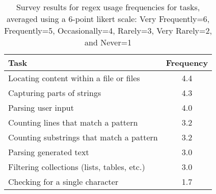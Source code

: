 \begin{table}
\caption{Survey results for regex usage frequencies for tasks, averaged using a 6-point likert scale: Very Frequently=6, Frequently=5, Occasionally=4, Rarely=3, Very Rarely=2, and Never=1 \label{table:regextasks}}
\begin{center}
\begin{small}
\begin{tabular}{l|c}
\toprule
\textbf{Task} & \textbf{Frequency} \\  \midrule \bigstrut
Locating content within a file or files & 4.4\\ \midrule \bigstrut
Capturing parts of strings & 4.3 \\ \midrule \bigstrut
Parsing user input & 4.0\\ \midrule \bigstrut
Counting lines that match a pattern & 3.2\\ \midrule \bigstrut
Counting  substrings that match a pattern & 3.2\\  \midrule \bigstrut
Parsing generated text & 3.0\\  \midrule \bigstrut
Filtering collections (lists, tables, etc.) & 3.0 \\ \midrule \bigstrut
Checking for a single character & 1.7\\
\bottomrule
\end{tabular}
\end{small}
\end{center}
\vspace{-12pt}
\end{table}

